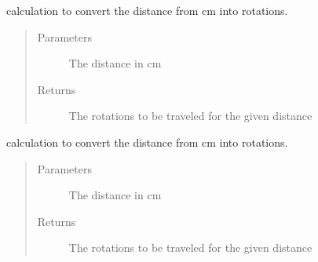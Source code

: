 \documentclass[letterpaper,10pt,english]{sphinxmanual}
\begin{document}
\begin{fulllineitems}
\begin{fulllineitems}
\label{\detokenize{spockbots:spockbots.motor.SpockbotsMotor.distance_to_angle}}
calculation to convert the distance from
cm into rotations.
\begin{quote}\begin{description}
\item[{Parameters}] \leavevmode
{} \textendash{} The distance in cm

\item[{Returns}] \leavevmode
The rotations to be traveled for the given distance

\end{description}\end{quote}

\end{fulllineitems}


\begin{fulllineitems}
\label{\detokenize{spockbots:spockbots.motor.SpockbotsMotor.distance_to_rotation}}
calculation to convert the distance from
cm into rotations.
\begin{quote}\begin{description}
\item[{Parameters}] \leavevmode
{} \textendash{} The distance in cm

\item[{Returns}] \leavevmode
The rotations to be traveled for the given distance

\end{description}\end{quote}

\end{fulllineitems}


\begin{fulllineitems}
\label{\detokenize{spockbots:spockbots.motor.SpockbotsMotor.followline}}
\end{fulllineitems}


\end{fulllineitems}
\end{document}
